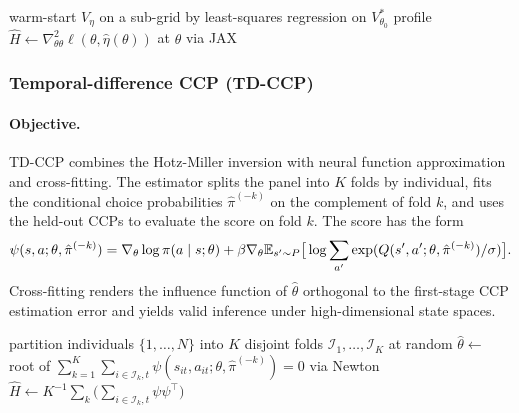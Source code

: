 \begin{algorithm}[H]
\SetAlgoLined
warm-start $V_\eta$ on a sub-grid by least-squares regression on $V^\ast_{\theta_0}$\;
profile $\hat H \leftarrow \nabla^2_{\theta\theta} \ell(\theta, \hat\eta(\theta))$ at $\hat\theta$ via JAX\;
\caption{Neural value approximation}
\end{algorithm}

\subsubsection{Temporal-difference CCP (TD-CCP)}

\paragraph{Objective.} TD-CCP \citep{adusumilli2025tdccp} combines the Hotz-Miller inversion with neural function approximation and cross-fitting. The estimator splits the panel into $K$ folds by individual, fits the conditional choice probabilities $\hat\pi^{(-k)}$ on the complement of fold $k$, and uses the held-out CCPs to evaluate the score on fold $k$. The score has the form
\begin{equation}
\psi(s, a; \theta, \hat\pi^{(-k)}) = \nabla_\theta \log \pi(a \mid s; \theta) + \beta \nabla_\theta \mathbb{E}_{s' \sim P} \big[ \log \sum_{a'} \exp(Q(s', a'; \theta, \hat\pi^{(-k)})/\sigma) \big].
\label{eq:tdccp}
\end{equation}
Cross-fitting renders the influence function of $\hat\theta$ orthogonal to the first-stage CCP estimation error and yields valid inference under high-dimensional state spaces.

\begin{algorithm}[H]
\SetAlgoLined
partition individuals $\{1, \dots, N\}$ into $K$ disjoint folds $\mathcal{I}_1, \dots, \mathcal{I}_K$ at random\;
$\hat\theta \leftarrow$ root of $\sum_{k=1}^K \sum_{i \in \mathcal{I}_k, t} \psi(s_{it}, a_{it}; \theta, \hat\pi^{(-k)}) = 0$ via Newton\;
$\hat H \leftarrow K^{-1} \sum_k \big( \sum_{i \in \mathcal{I}_k, t} \psi \psi^\top \big)$\;
\caption{Cross-fit TD-CCP}
\end{algorithm}

